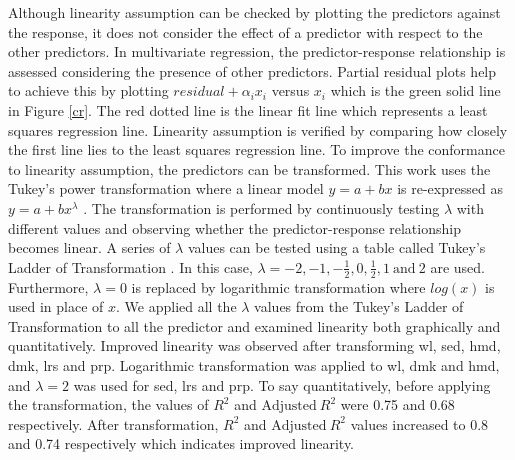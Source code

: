\documentclass[preprint,review,12pt]{elsarticle}
\begin{document}
Although linearity assumption can be checked by plotting the predictors against the response, it does not consider the effect of a predictor with respect to the other predictors. In multivariate regression, the predictor-response relationship is assessed considering the presence of other predictors. Partial residual plots help to achieve this by plotting $residual+ \alpha_{i}x_{i}$ versus $x_{i}$ which is the green solid line in Figure \ref{cr}. The red dotted line is the linear fit line which represents a least squares regression line. Linearity assumption is verified by comparing how closely the first line lies to the least squares regression line. To improve the conformance to linearity assumption, the predictors can be transformed. This work uses the Tukey's power transformation where a linear model $y=a+bx$ is re-expressed as $y=a+bx^{\lambda}$ \cite{tukey1977exploratory}. The transformation is performed by continuously testing $\lambda$ with different values and observing whether the predictor-response relationship becomes linear. A series of $\lambda$ values can be tested using a table called Tukey's Ladder of Transformation \cite{tukey1977exploratory}. In this case, $\lambda = -2,-1,-\frac{1}{2},0,\frac{1}{2},1~\text{and}~2$ are used. Furthermore, $\lambda = 0$ is replaced by logarithmic transformation where $log(x)$ is used in place of $x$. We applied all the $\lambda$ values from the Tukey's Ladder of Transformation to all the predictor and examined linearity both graphically and quantitatively. Improved linearity was observed after transforming wl, sed, hmd, dmk, lrs and prp. Logarithmic transformation was applied to wl, dmk and hmd, and $\lambda=2$ was used for sed, lrs and prp. To say quantitatively, before applying the transformation, the values of $R^{2}$ and $\text{Adjusted}~R^{2}$ were 0.75 and 0.68 respectively. After transformation, $R^{2}$ and $\text{Adjusted}~R^{2}$ values increased to 0.8 and 0.74 respectively which indicates improved linearity.   
\end{document}
